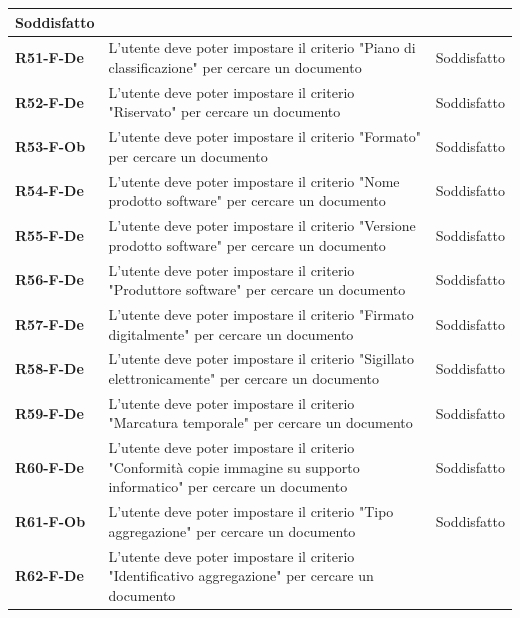 \documentclass[a4paper,12pt]{article}
\begin{document}
{{\begin{longtable}{|>{\centering\arraybackslash}m{}|>{\centering\arraybackslash}m{}|>{\centering\arraybackslash}m{}|}
                Soddisfatto \\ 
                \hline
                \textbf{R51-F-De} & L'utente deve poter impostare il criterio "Piano di classificazione" per cercare un documento & 
                Soddisfatto \\ 
                \hline
                \textbf{R52-F-De} & L'utente deve poter impostare il criterio "Riservato" per cercare un documento & 
                Soddisfatto \\ 
                \hline
                \textbf{R53-F-Ob} & L'utente deve poter impostare il criterio "Formato" per cercare un documento & 
                Soddisfatto \\ 
                \hline
                \textbf{R54-F-De} & L'utente deve poter impostare il criterio "Nome prodotto software" per cercare un documento & 
                Soddisfatto \\ 
                \hline
                \textbf{R55-F-De} & L'utente deve poter impostare il criterio "Versione prodotto software" per cercare un documento & 
                Soddisfatto \\ 
                \hline
                \textbf{R56-F-De} & L'utente deve poter impostare il criterio "Produttore software" per cercare un documento & 
                Soddisfatto \\ 
                \hline
                \textbf{R57-F-De} & L'utente deve poter impostare il criterio "Firmato digitalmente" per cercare un documento & 
                Soddisfatto \\ 
                \hline
                \textbf{R58-F-De} & L'utente deve poter impostare il criterio "Sigillato elettronicamente" per cercare un documento & 
                Soddisfatto \\ 
                \hline
                \textbf{R59-F-De} & L'utente deve poter impostare il criterio "Marcatura temporale" per cercare un documento & 
                Soddisfatto \\ 
                \hline
                \textbf{R60-F-De} & L'utente deve poter impostare il criterio "Conformità copie immagine su supporto informatico" per cercare un documento & 
                Soddisfatto \\ 
                \hline
                \textbf{R61-F-Ob} & L'utente deve poter impostare il criterio "Tipo aggregazione" per cercare un documento & 
                Soddisfatto \\ 
                \hline
                \textbf{R62-F-De} & L'utente deve poter impostare il criterio "Identificativo aggregazione" per cercare un documento & 

\end{longtable}}}
\end{document}
